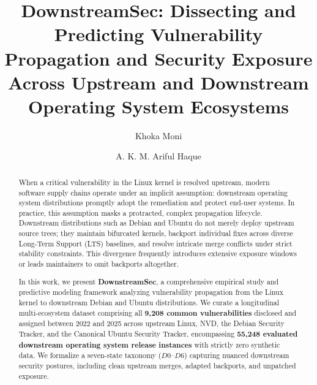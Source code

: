 \documentclass[final,5p,times,twocolumn]{elsarticle}
\begin{document}
\begin{frontmatter}

\title{DownstreamSec: Dissecting and Predicting Vulnerability Propagation and Security Exposure Across Upstream and Downstream Operating System Ecosystems}

\author[inst1]{Khoka Moni}

\author[inst1]{A. K. M. Ariful Haque}


\begin{abstract}
When a critical vulnerability in the Linux kernel is resolved upstream, modern software supply chains operate under an implicit assumption: downstream operating system distributions promptly adopt the remediation and protect end-user systems. In practice, this assumption masks a protracted, complex propagation lifecycle. Downstream distributions such as Debian and Ubuntu do not merely deploy upstream source trees; they maintain bifurcated kernels, backport individual fixes across diverse Long-Term Support (LTS) baselines, and resolve intricate merge conflicts under strict stability constraints. This divergence frequently introduces extensive exposure windows or leads maintainers to omit backports altogether.

In this work, we present \textbf{DownstreamSec}, a comprehensive empirical study and predictive modeling framework analyzing vulnerability propagation from the Linux kernel to downstream Debian and Ubuntu distributions. We curate a longitudinal multi-ecosystem dataset comprising all \textbf{9,208 common vulnerabilities} disclosed and assigned between 2022 and 2025 across upstream Linux, NVD, the Debian Security Tracker, and the Canonical Ubuntu Security Tracker, encompassing \textbf{55,248 evaluated downstream operating system release instances} with strictly zero synthetic data. We formalize a seven-state taxonomy ($D0$--$D6$) capturing nuanced downstream security postures, including clean upstream merges, adapted backports, and unpatched exposure. 


\end{abstract}
\end{frontmatter}
\end{document}
